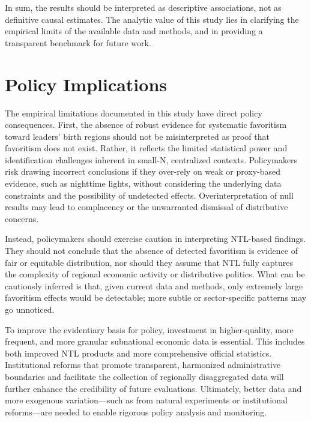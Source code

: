 \documentclass[12pt,a4paper]{article}
\begin{document}
In sum, the results should be interpreted as descriptive associations, not as definitive causal estimates. The analytic value of this study lies in clarifying the empirical limits of the available data and methods, and in providing a transparent benchmark for future work.

\section{Policy Implications}

The empirical limitations documented in this study have direct policy consequences. First, the absence of robust evidence for systematic favoritism toward leaders' birth regions should not be misinterpreted as proof that favoritism does not exist. Rather, it reflects the limited statistical power and identification challenges inherent in small-N, centralized contexts. Policymakers risk drawing incorrect conclusions if they over-rely on weak or proxy-based evidence, such as nighttime lights, without considering the underlying data constraints and the possibility of undetected effects. Overinterpretation of null results may lead to complacency or the unwarranted dismissal of distributive concerns.

Instead, policymakers should exercise caution in interpreting NTL-based findings. They should not conclude that the absence of detected favoritism is evidence of fair or equitable distribution, nor should they assume that NTL fully captures the complexity of regional economic activity or distributive politics. What can be cautiously inferred is that, given current data and methods, only extremely large favoritism effects would be detectable; more subtle or sector-specific patterns may go unnoticed.

To improve the evidentiary basis for policy, investment in higher-quality, more frequent, and more granular subnational economic data is essential. This includes both improved NTL products and more comprehensive official statistics. Institutional reforms that promote transparent, harmonized administrative boundaries and facilitate the collection of regionally disaggregated data will further enhance the credibility of future evaluations. Ultimately, better data and more exogenous variation—such as from natural experiments or institutional reforms—are needed to enable rigorous policy analysis and monitoring.
\end{document}
